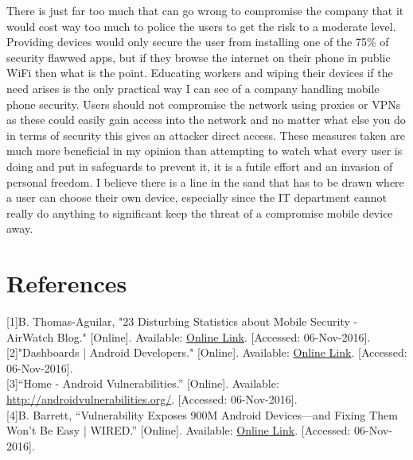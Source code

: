 \documentclass[a4paper, 11pt]{article}
\begin{document}
There is just far too much that can go wrong to compromise the company that it would cost way too much to police the users to get the risk to a moderate level.  Providing devices would only secure the user from installing one of the 75\% of security flawwed apps, but if they browse the internet on their phone in public WiFi then what is the point.  Educating workers and wiping their devices if the need arises is the only practical way I can see of a company handling mobile phone security.  Users should not compromise the network using proxies or VPNs as these could easily gain access into the network and no matter what else you do in terms of security this gives an attacker direct access.  These measures taken are much more beneficial in my opinion than attempting to watch what every user is doing and put in safeguards to prevent it, it is a futile effort and an invasion of personal freedom.  I believe there is a line in the sand that has to be drawn where a user can choose their own device, especially since the IT department cannot really do anything to significant keep the threat of a compromise mobile device away.

\section*{References}

[1]B. Thomas-Aguilar, "23 Disturbing Statistics about Mobile Security - AirWatch Blog." [Online]. Available: \href{http://blogs.air-watch.com/2015/10/23-disturbing-statistics-mobile-security\\/\#.WB56rtWsD7g}{Online Link}. [Accessed: 06-Nov-2016].\\

[2]"Dashboards | Android Developers." [Online]. Available: \href{https://developer.android.com/about/dashboards/index.html}{Online Link}. [Accessed: 06-Nov-2016].\\

[3]“Home - Android Vulnerabilities.” [Online]. Available: \href{http://androidvulnerabilities.org/}{http://androidvulnerabilities.org/}. [Accessed: 06-Nov-2016].\\

[4]B. Barrett, “Vulnerability Exposes 900M Android Devices—and Fixing Them Won’t Be Easy | WIRED.” [Online]. Available: \href{https://www.wired.com/2016/08/quadroot-android-vulnerability-qualcomm/}{Online Link}. [Accessed: 06-Nov-2016].\\
\end{document}
